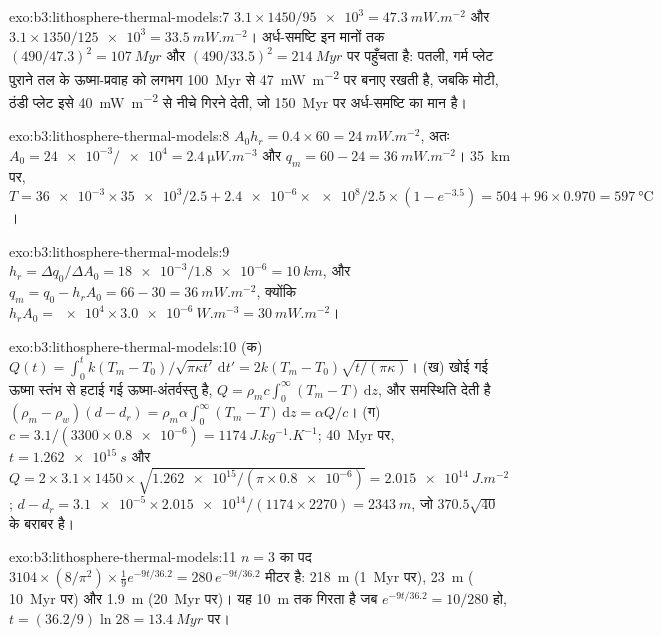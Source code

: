\begin{solution}{exo:b3:lithosphere-thermal-models:7}
$3.1\times1450/\num{95e3} = \qty{47.3}{mW.m^{-2}}$ और $3.1\times1350/\num{125e3}
= \qty{33.5}{mW.m^{-2}}$। अर्ध-समष्टि इन मानों तक $(490/47.3)^2 =
\qty{107}{Myr}$ और $(490/33.5)^2 = \qty{214}{Myr}$ पर पहुँचता है: पतली, गर्म प्लेट
पुराने तल के ऊष्मा-प्रवाह को लगभग \qty{100}{Myr} से \qty{47}{mW.m^{-2}} पर बनाए रखती है,
जबकि मोटी, ठंडी प्लेट इसे
\qty{40}{mW.m^{-2}} से नीचे गिरने देती, जो \qty{150}{Myr} पर अर्ध-समष्टि का मान है।
\end{solution}

\begin{solution}{exo:b3:lithosphere-thermal-models:8}
$A_0h_r = 0.4\times60 = \qty{24}{mW.m^{-2}}$, अतः $A_0 =
\num{24e-3}/\num{e4} = \qty{2.4}{\micro W.m^{-3}}$ और $q_m = 60 - 24 =
\qty{36}{mW.m^{-2}}$। \qty{35}{km} पर, $T = \num{36e-3}\times\num{35e3}/2.5 +
\num{2.4e-6}\times\num{e8}/2.5\times(1 - e^{-3.5}) = 504 + 96\times0.970 =
\qty{597}{\celsius}$।
\end{solution}

\begin{solution}{exo:b3:lithosphere-thermal-models:9}
$h_r = \Delta q_0/\Delta A_0 = \num{18e-3}/\num{1.8e-6} = \qty{10}{km}$, और
$q_m = q_0 - h_rA_0 = 66 - 30 = \qty{36}{mW.m^{-2}}$, क्योंकि $h_rA_0 =
\num{e4}\times\qty{3.0e-6}{W.m^{-3}} = \qty{30}{mW.m^{-2}}$।
\end{solution}

\begin{solution}{exo:b3:lithosphere-thermal-models:10}
(क) $Q(t) = \int_0^tk(T_m - T_0)/\sqrt{\pi\kappa t'}\,\mathrm dt' =
2k(T_m - T_0)\sqrt{t/(\pi\kappa)}$। (ख) खोई गई ऊष्मा स्तंभ से हटाई गई
ऊष्मा-अंतर्वस्तु है, $Q = \rho_mc\int_0^\infty(T_m - T)\,\mathrm dz$, और
समस्थिति देती है $(\rho_m - \rho_w)(d - d_r) = \rho_m\alpha\int_0^\infty(T_m -
T)\,\mathrm dz = \alpha Q/c$। (ग) $c = 3.1/(3300\times\num{0.8e-6}) =
\qty{1174}{J.kg^{-1}.K^{-1}}$; \qty{40}{Myr} पर, $t = \qty{1.262e15}{s}$ और
$Q = 2\times3.1\times1450\times\sqrt{\num{1.262e15}/(\pi\times\num{0.8e-6})} =
\qty{2.015e14}{J.m^{-2}}$; $d - d_r = \num{3.1e-5}\times\num{2.015e14}/
(1174\times2270) = \qty{2343}{m}$, जो $370.5\sqrt{40}$ के बराबर है।
\end{solution}

\begin{solution}{exo:b3:lithosphere-thermal-models:11}
$n = 3$ का पद $3104\times(8/\pi^2)\times\tfrac19e^{-9t/36.2} =
280\,e^{-9t/36.2}$ मीटर है: \qty{218}{m} (\qty{1}{Myr} पर), \qty{23}{m} (
\qty{10}{Myr} पर) और \qty{1.9}{m} (\qty{20}{Myr} पर)। यह \qty{10}{m} तक गिरता है जब
$e^{-9t/36.2} = 10/280$ हो, $t = (36.2/9)\ln28 = \qty{13.4}{Myr}$ पर।
\end{solution}

